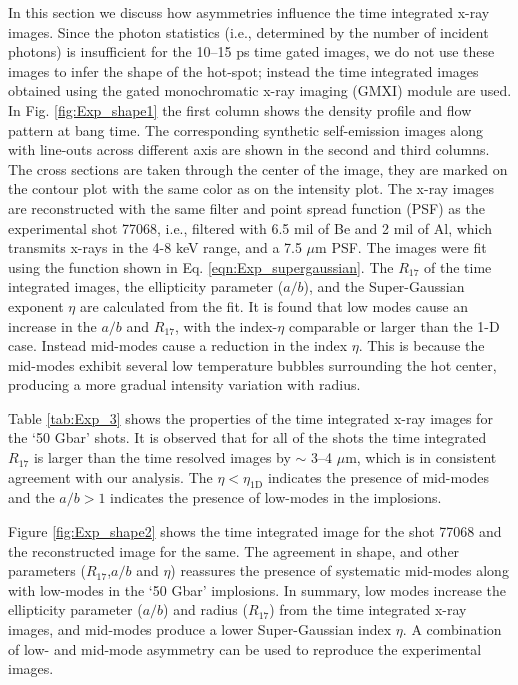 \documentclass[aip,reprint]{revtex4-1}
\begin{document}
In this section we discuss how asymmetries influence the time integrated x-ray images. Since the photon statistics (i.e., determined by the number of incident photons) is insufficient for the 10--15 ps time gated images, we do not use these images to infer the shape of the hot-spot; instead the time integrated images obtained using the gated monochromatic x-ray imaging (GMXI) module \cite{Exp_GMXI} are used. In Fig. \ref{fig:Exp_shape1} the first column shows the density profile and flow pattern at bang time. The corresponding synthetic self-emission images along with line-outs across different axis are shown in the second and third columns. The cross sections are taken through the center of the image, they are marked on the contour plot with the same color as on the intensity plot. The x-ray images are reconstructed with the same filter and point spread function (PSF) as the experimental shot 77068, i.e., filtered with 6.5 mil of Be and 2 mil of Al, which transmits x-rays in the 4-8 keV range, and a 7.5 $\mu$m PSF. The images were fit using the function shown in Eq. \ref{eqn:Exp_supergaussian}. The $R_{17}$ of the time integrated images, the ellipticity parameter ($a/b$), and the Super-Gaussian exponent $\eta$ are calculated from the fit. It is found that low modes cause an increase in the $a/b$ and $R_{17}$, with the index-$\eta$ comparable or larger than the 1-D case. Instead mid-modes cause a reduction in the index $\eta$. This is because the mid-modes exhibit several low temperature bubbles surrounding the hot center, producing a more gradual intensity variation with radius. 
%
%
%
%

 Table \ref{tab:Exp_3} shows the properties of the time integrated x-ray images for the `50 Gbar' shots. It is observed that for all of the shots the time integrated $R_{17}$ is larger than the time resolved images by $\sim$ 3--4 $\mu$m, which is in consistent agreement with our analysis. The $\eta < \eta_\text{1D}$ indicates the presence of mid-modes and the $a/b>1$ indicates the presence of low-modes in the implosions.


 Figure \ref{fig:Exp_shape2} shows the time integrated image for the shot 77068 and the reconstructed image for the same. The agreement in shape, and other parameters ($R_{17}$,$a/b$ and $\eta$) reassures the presence of systematic mid-modes along with low-modes in the `50 Gbar' implosions. In summary, low modes increase the ellipticity parameter ($a/b$) and radius ($R_{17}$) from the time integrated x-ray images, and mid-modes produce a lower Super-Gaussian index $\eta$. A combination of low- and mid-mode asymmetry can be used to reproduce the experimental images. 
%
%
%
%
\end{document}
